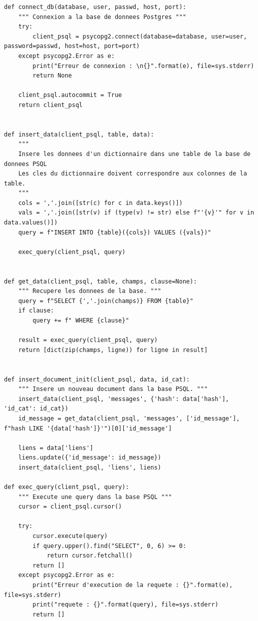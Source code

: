 \documentclass[a4paper,12pt]{article}
\begin{document}
				\begin{lstlisting}[title=Fonctions basiques pour la liaison PostgreSQL]
def connect_db(database, user, passwd, host, port):
    """ Connexion a la base de donnees Postgres """
    try:
        client_psql = psycopg2.connect(database=database, user=user, password=passwd, host=host, port=port)
    except psycopg2.Error as e:
        print("Erreur de connexion : \n{}".format(e), file=sys.stderr)
        return None

    client_psql.autocommit = True
    return client_psql
    
    
def insert_data(client_psql, table, data):
    """
    Insere les donnees d'un dictionnaire dans une table de la base de donnees PSQL
    Les cles du dictionnaire doivent correspondre aux colonnes de la table.
    """
    cols = ','.join([str(c) for c in data.keys()])
    vals = ','.join([str(v) if (type(v) != str) else f"'{v}'" for v in data.values()])
    query = f"INSERT INTO {table}({cols}) VALUES ({vals})"

    exec_query(client_psql, query)


def get_data(client_psql, table, champs, clause=None):
    """ Recupere les donnees de la base. """
    query = f"SELECT {','.join(champs)} FROM {table}"
    if clause:
        query += f" WHERE {clause}"

    result = exec_query(client_psql, query)
    return [dict(zip(champs, ligne)) for ligne in result]
    
    
def insert_document_init(client_psql, data, id_cat):
    """ Insere un nouveau document dans la base PSQL. """
    insert_data(client_psql, 'messages', {'hash': data['hash'], 'id_cat': id_cat})
    id_message = get_data(client_psql, 'messages', ['id_message'], f"hash LIKE '{data['hash']}'")[0]['id_message']

    liens = data['liens']
    liens.update({'id_message': id_message})
    insert_data(client_psql, 'liens', liens)   
    
def exec_query(client_psql, query):
    """ Execute une query dans la base PSQL """
    cursor = client_psql.cursor()

    try:
        cursor.execute(query)
        if query.upper().find("SELECT", 0, 6) >= 0:
            return cursor.fetchall()
        return []
    except psycopg2.Error as e:
        print("Erreur d'execution de la requete : {}".format(e), file=sys.stderr)
        print("requete : {}".format(query), file=sys.stderr)
        return []
				\end{lstlisting}
				
\end{document}
